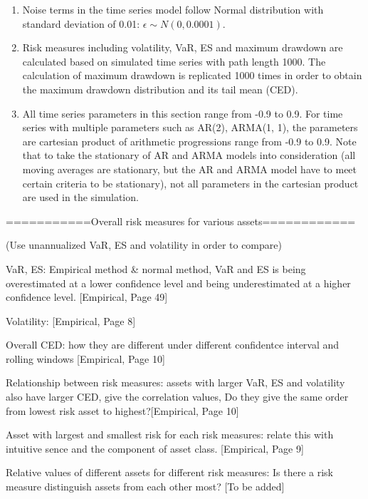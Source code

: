 \documentclass[11pt]{article}
\begin{document}
\begin{enumerate}
\item Noise terms in the time series model follow Normal distribution with standard deviation of 0.01: $\epsilon \sim N(0, 0.0001)$.
\item Risk measures including volatility, VaR, ES and maximum drawdown are calculated based on simulated time series with path length 1000. The calculation of maximum drawdown is replicated 1000 times in order to obtain the maximum drawdown distribution and its tail mean (CED).
\item All time series parameters in this section range from -0.9 to 0.9. For time series with multiple parameters such as AR(2), ARMA(1, 1), the parameters are cartesian product of arithmetic progressions range from -0.9 to 0.9. Note that to take the stationary of AR and ARMA models into consideration (all moving averages are stationary, but the AR and ARMA model have to meet certain criteria to be stationary), not all parameters in the cartesian product are used in the simulation.
\end{enumerate}

\newpage









\clearpage


===========Overall risk measures for various assets============

(Use unannualized VaR, ES and volatility in order to compare)

VaR, ES: Empirical method \& normal method, VaR and ES is being overestimated at a lower confidence level and being underestimated at a higher confidence level. [Empirical, Page 49]

Volatility: [Empirical, Page 8]

Overall CED: how they are different under different confidentce interval and rolling windows [Empirical, Page 10]

Relationship between risk measures: assets with larger VaR, ES and volatility also have larger CED, give the correlation values, Do they give the same order from lowest risk asset to highest?[Empirical, Page 10]

Asset with largest and smallest risk for each risk measures: relate this with intuitive sence and the component of asset class. [Empirical, Page 9]

Relative values of different assets for different risk measures: Is there a risk measure distinguish assets from each other most? [To be added]
\end{document}
